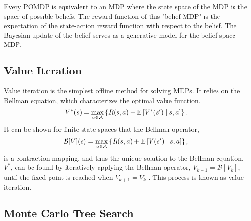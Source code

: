 Every POMDP is equivalent to an MDP where the state space of the MDP is the space of possible beliefs.
The reward function of this "belief MDP" is the expectation of the state-action reward function with respect to the belief.
The Bayesian update of the belief serves as a generative model for the belief space MDP.

\subsection{Value Iteration}

Value iteration is the simplest offline method for solving MDPs.
It relies on the Bellman equation, which characterizes the optimal value function,
\begin{equation}
    V^*(s) = \max_{a \in \mathcal{A}} \left\{R(s,a) + \text{E}\left[V^*(s') \mid s, a \right]\right\} \text{.}
\end{equation}
It can be shown for finite state spaces that the Bellman operator,
\begin{equation}
    \mathcal{B}[V](s) = \max_{a \in \mathcal{A}} \left\{R(s,a) + \text{E} \left[V(s') \mid s, a \right] \right\} \text{,}
\end{equation}
is a contraction mapping, and thus the unique solution to the Bellman equation, $V^*$, can be found by iteratively applying the Bellman operator, $V_{k+1} = \mathcal{B}[V_k]$, until the fixed point is reached when $V_{k+1} = V_k$ \cite{DB:05}.
This process is known as value iteration.

\subsection{Monte Carlo Tree Search} \label{sec:mcts}

